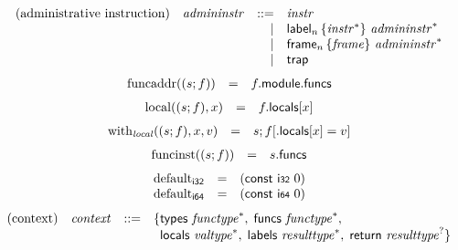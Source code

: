 \documentclass{article}
\begin{document}
$$
\begin{array}{@{}lrrl@{}l@{}}
\mbox{(administrative instruction)} & {\mathit{admininstr}} &::=& {\mathit{instr}} \\ &&|&
{\mathsf{label}}_{n}\,\{ {{\mathit{instr}}^\ast} \}~{{\mathit{admininstr}}^\ast} \\ &&|&
{\mathsf{frame}}_{n}\,\{ {\mathit{frame}} \}~{{\mathit{admininstr}}^\ast} \\ &&|&
\mathsf{trap} \\
\end{array}
$$
$$
\begin{array}{@{}lcl@{}l@{}}
{\mathrm{funcaddr}}((s ; f)) &=& f{.}\mathsf{module}{.}\mathsf{funcs} \\
\end{array}
$$
$$
\begin{array}{@{}lcl@{}l@{}}
{\mathrm{local}}((s ; f), x) &=& f{.}\mathsf{locals}{}[x] \\
\end{array}
$$
$$
\begin{array}{@{}lcl@{}l@{}}
{\mathrm{with}}_{\mathit{local}}((s ; f), x, v) &=& s ; f{}[{.}\mathsf{locals}{}[x] = v] \\
\end{array}
$$
$$
\begin{array}{@{}lcl@{}l@{}}
{\mathrm{funcinst}}((s ; f)) &=& s{.}\mathsf{funcs} \\
\end{array}
$$
$$
\begin{array}{@{}lcl@{}l@{}}
{{\mathrm{default}}}_{\mathsf{i{\scriptstyle 32}}} &=& (\mathsf{const}~\mathsf{i{\scriptstyle 32}}~0) \\
{{\mathrm{default}}}_{\mathsf{i{\scriptstyle 64}}} &=& (\mathsf{const}~\mathsf{i{\scriptstyle 64}}~0) \\
\end{array}
$$
$$
\begin{array}{@{}lrrl@{}l@{}}
\mbox{(context)} & {\mathit{context}} &::=& \{ \begin{array}[t]{@{}l@{}l@{}}
\mathsf{types}~{{\mathit{functype}}^\ast},\; \mathsf{funcs}~{{\mathit{functype}}^\ast},\; \\
  \mathsf{locals}~{{\mathit{valtype}}^\ast},\; \mathsf{labels}~{{\mathit{resulttype}}^\ast},\; \mathsf{return}~{{\mathit{resulttype}}^?} \}\end{array} \\
\end{array}
$$
\end{document}
